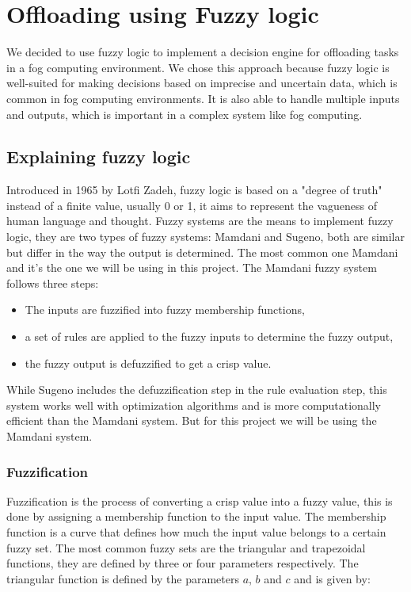 \chapter{Offloading using Fuzzy logic}
\label{chap:fuzzy}

We decided to use fuzzy logic to implement a decision engine for offloading tasks in a fog computing environment. We chose
this approach because fuzzy logic is well-suited for making decisions based on imprecise and uncertain data, which is
common in fog computing environments.  It is also able to handle multiple inputs and outputs, which is important in a
complex system like fog computing.

\section{Explaining fuzzy logic}
\label{sec:fuzzy-explanation}

Introduced in 1965 by Lotfi Zadeh,\cite{zadeh-1965} fuzzy logic is based on a "degree of truth" instead of a finite
value, usually 0 or 1, it aims to represent the vagueness of human language and thought. Fuzzy systems are the means
to implement fuzzy logic, they are two types of fuzzy systems: Mamdani and Sugeno, both are similar but differ in the
way the output is determined. The most common one Mamdani and it's the one we will be using in this project. The
Mamdani fuzzy system follows three steps:

\begin{itemize}
  \item The inputs are fuzzified into fuzzy membership functions,
  \item a set of rules are applied to the fuzzy inputs to determine the fuzzy output,
  \item the fuzzy output is defuzzified to get a crisp value.
\end{itemize}

While Sugeno includes the defuzzification step in the rule evaluation step, this system works well with optimization
algorithms and is more computationally efficient than the Mamdani system. But for this project we will be using the
Mamdani system.

\subsection{Fuzzification}
\label{subsec:fuzzy-fuzzification}

Fuzzification is the process of converting a crisp value into a fuzzy value, this is done by assigning a membership
function to the input value. The membership function is a curve that defines how much the input value belongs to a
certain fuzzy set. The most common fuzzy sets are the triangular and trapezoidal functions, they are defined by three
or four parameters respectively. The triangular function is defined by the parameters $a$, $b$ and $c$ and is given by:


